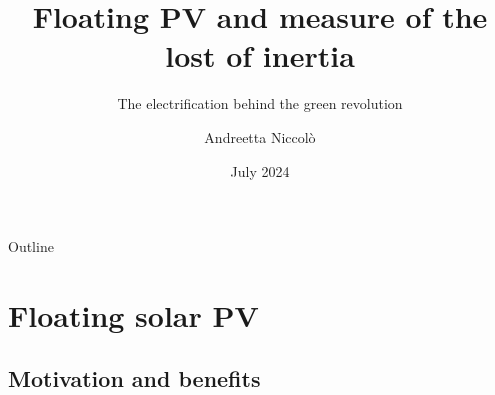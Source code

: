 \documentclass[aspectratio=169, 12pt]{beamer}
\title{Floating PV and measure of the lost of inertia }
\subtitle{The electrification behind the green revolution}
\author{Andreetta Niccolò}
\date{July 2024}
\begin{document}
  \maketitle

  \begin{frame}[fragile]{Outline}
    \tableofcontents
  \end{frame}

               

\section{Floating solar PV}
\subsection{Motivation and benefits}
\end{document}
